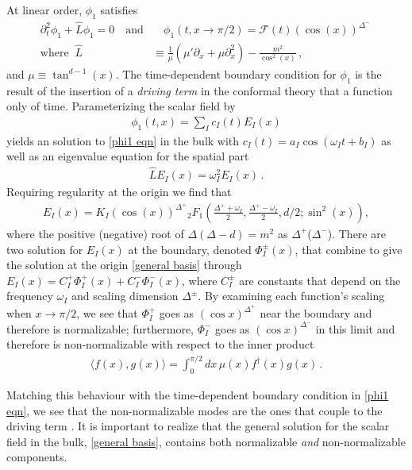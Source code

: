 \documentclass[letterpaper,11pt]{article}
\newcommand{\p}{\partial}
\newcommand{\mc}{\mathcal}
\begin{document}
At linear order, $\phi_1$ satisfies
\begin{align}
\label{phi1 eqn}
\p^2_t \phi_1 + \hat L \phi_1 = 0 \quad \text{and}& \quad \phi_1(t, x \to \pi/2) = \mc F(t) \left( \cos(x) \right)^{\Delta^-}\, \\
\text{where} \;\; \hat{L} &\equiv \frac{1}{\mu} (\mu' \p_x + \mu \p^2_x)  - \frac{m^2}{\cos^2(x)} \, ,
\end{align}
and $\mu \equiv \tan^{d-1}(x)$. The time-dependent boundary condition for $\phi_1$ is the result of the insertion of a \emph{driving term} in the conformal theory that a function only of time. Parameterizing the scalar field by
\begin{align}
	\phi_1 (t, x) = \sum_I c_I (t) E_I (x)
\end{align}
yields an solution to \eqref{phi1 eqn} in the bulk with $c_I(t) = a_I \cos \left( \omega_I t + b_I \right)$ as well as an
eigenvalue equation for the spatial part
\begin{align}
	\label{eigen eqn}
\hat L E_I (x) = \omega_I^2 E_I (x) \, .
\end{align}
Requiring regularity at the origin we find that \cite{hep-th/9805171}
\begin{align}
	\label{general basis}
	E_I (x) =  K_I \left( \cos(x) \right)^{\Delta^+} {_2F_1} \left(\frac{\Delta^+ + \omega_I}{2}, \frac{\Delta^+ - \omega_I}{2}, d/2 ; \sin^2 (x) \right) ,
\end{align}
where the positive (negative) root of $\Delta (\Delta - d) = m^2$ as $\Delta^+$($\Delta^-$). There are two solution for $E_I(x)$ at the boundary, denoted $\Phi^\pm_I (x)$, that combine to give the solution at the origin \eqref{general basis} through $E_I (x) = C_I^+ \Phi^+_I(x) + C^{-}_I \Phi^{-}_I (x)$, where $C^{\pm}_I$ are constants that depend on the frequency $\omega_I$ and scaling dimension $\Delta^{\pm}$. By examining each function's scaling when $x \to \pi/2$,  we see that $\Phi_I^+$ goes as $(\cos x )^{\Delta^+}$ near the boundary and therefore is normalizable; furthermore, $\Phi_I^-$ goes as $( \cos x )^{\Delta^-}$ in this limit and therefore is non-normalizable with respect to the inner product
\begin{align}
	\label{inner prod}
	\langle f(x), g(x) \rangle = \int^{\pi/2}_0 dx \, \mu(x) f^\dagger(x) g(x) \, .
\end{align}

Matching this behaviour with the time-dependent boundary condition in \eqref{phi1 eqn}, we see that the non-normalizable modes are the ones that couple to the driving term \cite{Nastase}. It is important to realize that the general solution for the scalar field in the bulk, \eqref{general basis}, contains both normalizable \emph{and} non-normalizable components.
\end{document}
